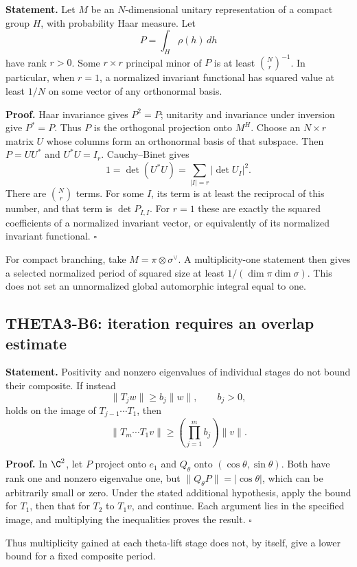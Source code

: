 \documentclass[11pt]{article}
\theoremstyle{definition}\newtheorem{definition}[theorem]{Definition}\newtheorem{remark}[theorem]{Remark}
\begin{document}
\textbf{Statement.} Let $M$ be an $N$-dimensional unitary representation of a compact group $H$, with probability Haar measure. Let
\[
 P=\int_H\rho(h)\,dh
\]
have rank $r>0$. Some $r\times r$ principal minor of $P$ is at least $\binom Nr^{-1}$. In particular, when $r=1$, a normalized invariant functional has squared value at least $1/N$ on some vector of any orthonormal basis.

\textbf{Proof.} Haar invariance gives $P^2=P$; unitarity and invariance under inversion give $P^*=P$. Thus $P$ is the orthogonal projection onto $M^H$. Choose an $N\times r$ matrix $U$ whose columns form an orthonormal basis of that subspace. Then $P=UU^*$ and $U^*U=I_r$. Cauchy--Binet gives
\[
 1=\det(U^*U)=\sum_{|I|=r}|\det U_I|^2.
\]
There are $\binom Nr$ terms. For some $I$, its term is at least the reciprocal of this number, and that term is $\det P_{I,I}$. For $r=1$ these are exactly the squared coefficients of a normalized invariant vector, or equivalently of its normalized invariant functional. \hfill$\square$

For compact branching, take $M=\pi\otimes\sigma^\vee$. A multiplicity-one statement then gives a selected normalized period of squared size at least $1/(\dim\pi\dim\sigma)$. This does not set an unnormalized global automorphic integral equal to one.

\subsection{THETA3-B6: iteration requires an overlap estimate}\label{B6}

\textbf{Statement.} Positivity and nonzero eigenvalues of individual stages do not bound their composite. If instead
\[
 \|T_jw\|\geq b_j\|w\|,\qquad b_j>0,
\]
holds on the image of $T_{j-1}\cdots T_1$, then
\[
 \|T_m\cdots T_1v\|\geq\left(\prod_{j=1}^m b_j\right)\|v\|.
\]

\textbf{Proof.} In $\C^2$, let $P$ project onto $e_1$ and $Q_\theta$ onto $(\cos\theta,\sin\theta)$. Both have rank one and nonzero eigenvalue one, but $\|Q_\theta P\|=|\cos\theta|$, which can be arbitrarily small or zero. Under the stated additional hypothesis, apply the bound for $T_1$, then that for $T_2$ to $T_1v$, and continue. Each argument lies in the specified image, and multiplying the inequalities proves the result. \hfill$\square$

Thus multiplicity gained at each theta-lift stage does not, by itself, give a lower bound for a fixed composite period.
\end{document}
